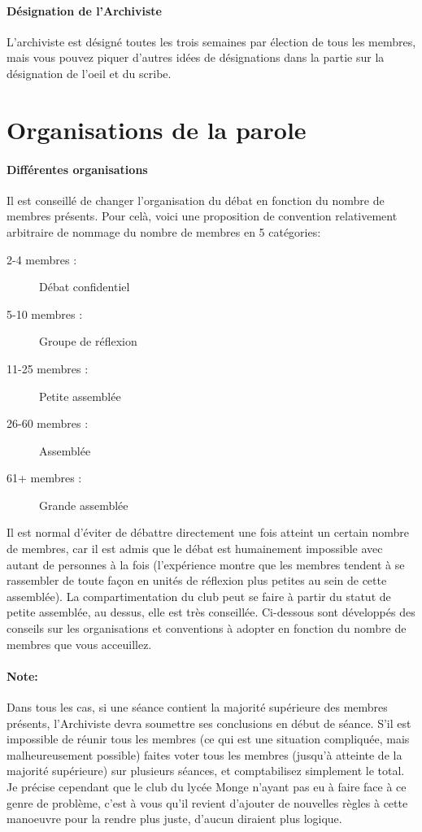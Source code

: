 \documentclass[a4paper,11pt]{article}
\begin{document}
\paragraph{Désignation de l'Archiviste}
L'archiviste est désigné toutes les trois semaines par élection de tous les membres, mais vous pouvez piquer d'autres idées de désignations dans la partie sur la désignation de l'oeil et du scribe. 

\section{Organisations de la parole}
\paragraph{Différentes organisations}
Il est conseillé de changer l'organisation du débat en fonction du nombre de membres présents. Pour celà, voici une proposition de convention relativement arbitraire de nommage du nombre de membres en 5 catégories:
\begin{description}
 \item[2-4 membres :] Débat confidentiel
 \item[5-10 membres :] Groupe de réflexion
 \item[11-25 membres :] Petite assemblée
 \item[26-60 membres :] Assemblée
 \item[61+ membres :] Grande assemblée
\end{description}

Il est normal d'éviter de débattre directement une fois atteint un certain nombre de membres, car il est admis que le débat est humainement impossible avec autant de personnes à la fois (l'expérience montre que les membres tendent à se rassembler de toute façon en unités de réflexion plus petites au sein de cette assemblée). La compartimentation du club peut se faire à partir du statut de petite assemblée, au dessus, elle est très conseillée. Ci-dessous sont développés des conseils sur les organisations et conventions à adopter en fonction du nombre de membres que vous acceuillez.

\paragraph{Note:}
Dans tous les cas, si une séance contient la majorité supérieure des membres présents, l'Archiviste devra soumettre ses conclusions en début de séance. S'il est impossible de réunir tous les membres (ce qui est une situation compliquée, mais malheureusement possible) faites voter tous les membres (jusqu'à atteinte de la majorité supérieure) sur plusieurs séances, et comptabilisez simplement le total. Je précise cependant que le club du lycée Monge n'ayant pas eu à faire face à ce genre de problème, c'est à vous qu'il revient d'ajouter de nouvelles règles à cette manoeuvre pour la rendre plus juste, d'aucun diraient plus logique.
\end{document}

